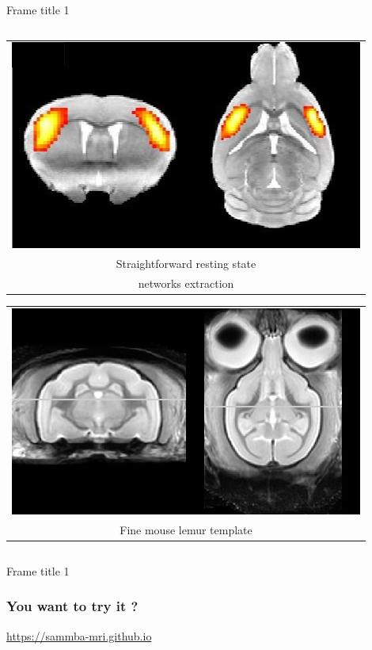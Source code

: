 \documentclass{beamer}
\begin{document}
\begin{frame}{Frame title 1}
\begin{center}
\begin{columns}
      \begin{column}{0.55\textwidth}
        \begin{tabular}{c} 
	   \includegraphics[width=0.7\linewidth]{Images/component26_not_annotated.png}\\
		{Straightforward resting state}\\
		{networks extraction}
        \end{tabular}   
       \begin{tabular}{c} 
		\includegraphics[width=.7\linewidth]{Images/sfn_template.jpg}\\
		{Fine mouse lemur template}\\
		\end{tabular}   
       \end{column}

     \end{columns}
   \end{center}

\end{frame}
\begin{frame}{Frame title 1}
\frametitle{You want to try it ?}
\vspace*{3cm}
\begin{center}
\huge{\textcolor{yellow}{\url{https://sammba-mri.github.io}}}
\end{center}
\vspace*{4cm}
\end{frame}
%
%
%
\end{document}
